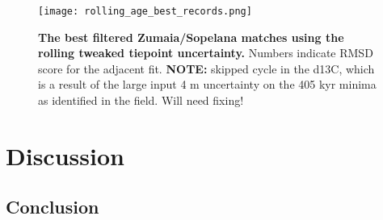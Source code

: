 \documentclass[draft]{agujournal2019}
\begin{document}
\begin{figure}[htb]
\centering
\texttt{[image: rolling\_age\_best\_records.png]}
\caption{\label{fig:rolling-age}
    \textbf{The best filtered Zumaia/Sopelana matches using the rolling tweaked tiepoint uncertainty.}
    Numbers indicate \gls{RMSD} score for the adjacent fit.
    \textbf{NOTE:} skipped cycle in the \gls{d13C}, which is a result of the large input \textpm{}4 m uncertainty on the 405 kyr minima as identified in the field.
    Will need fixing!
}
\end{figure}




\section{Discussion}\label{sec:discussion}




\subsection{Conclusion}\label{sec:conclusion}







%
%
%
%
%
%
%
%
%
%
\end{document}
